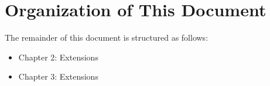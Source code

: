 %
%
%
%
%

\section{Organization of This Document}
The remainder of this document is structured as follows:

\begin{itemize}
 \item Chapter 2: {\XMP} Extensions
 \item Chapter 3: {\OACC} Extensions
\end{itemize}
